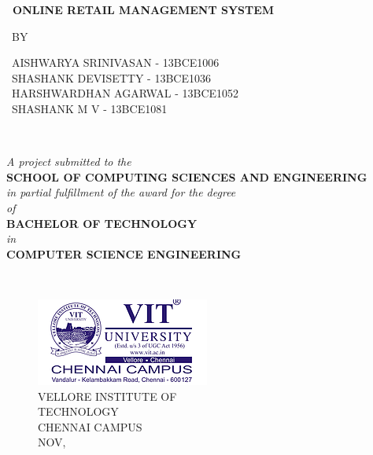 \documentclass{tcc}
\begin{document}
\setlength{\paperwidth}{21cm}
\setlength{\paperheight}{29.7cm}
\setlength{\pdfpagewidth}{\paperwidth}
\setlength{\pdfpageheight}{\paperheight}

\begin{center}
\Large{\bf \ ONLINE RETAIL MANAGEMENT SYSTEM}\\
\end{center}

\begin{center}
\ BY\\
\end{center}

\begin{center}
\ AISHWARYA SRINIVASAN\hspace{1.3cm} - 13BCE1006\\
\ SHASHANK DEVISETTY\hspace{1.5cm}    - 13BCE1036\\
\ HARSHWARDHAN AGARWAL\hspace{0.5cm} - 13BCE1052\\
\ SHASHANK M V \hspace{3cm}  - 13BCE1081\\
\end{center}
\ \\

\begin{center}
\textit{A project submitted to the}\\
\textbf{SCHOOL OF COMPUTING SCIENCES AND ENGINEERING}\\
\textit{in partial fulfillment of the award for the degree}\\
\textit{of}\\
\textbf{BACHELOR OF TECHNOLOGY}\\
\textit{in}\\
\textbf{COMPUTER SCIENCE ENGINEERING}\\
\end{center}
\ \\
\begin{figure}[H]
\centering
\includegraphics{images/vit.png}\\
VELLORE INSTITUTE OF\\ TECHNOLOGY\\
CHENNAI CAMPUS\\
NOV, \the\year
\end{figure}
\end{document}
